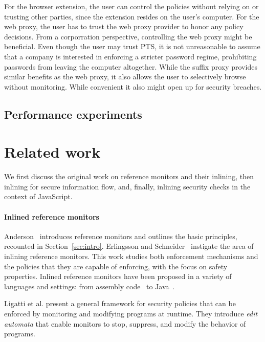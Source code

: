 \documentclass{llncs}
\begin{document}
For the browser extension, the user can control the policies without relying on
or trusting other parties, since the extension resides on the user's computer.
For the web proxy, the user has to trust the web proxy provider to honor any
policy decisions. From a corporration perspective, controlling the web proxy
might be beneficial. Even though the user may trust PTS, it is not unreasonable
to assume that a company is interested in enforcing a stricter password regime,
prohibiting passwords from leaving the computer altogether. 
While the suffix proxy provides similar benefits as the web proxy, it also allows 
the user to selectively browse without monitoring. While convenient it also
might open up for security breaches.


\subsection{Performance experiments}

\section{Related work}
\label{sec:related}
We first discuss the original work on reference monitors and their
inlining, then
inlining for secure information flow, 
and, finally,
inlining security checks in the context of
JavaScript.

\paragraph{Inlined reference monitors}
Anderson~\cite{Anderson:72} introduces reference monitors and
outlines the basic principles, recounted in Section~\ref{sec:intro}.
%
Erlingsson and Schneider~\cite{DBLP:conf/nspw/ErlingssonS99,Erlingsson:PhD04} instigate
the area of inlining reference monitors. 
This work studies both enforcement mechanisms and the policies
that they are capable of enforcing, with the focus on safety properties.
Inlined reference monitors
have been proposed in a variety of languages and settings: from
assembly code~\cite{DBLP:conf/nspw/ErlingssonS99} to Java~\cite{DBLP:conf/ecoop/DamJLP09,DBLP:journals/jcs/DamJLP10,DBLP:conf/ccs/DamGL12}.

Ligatti et al. \cite{Ligatti05editautomata:} present a 
general framework for security policies that can
be enforced by monitoring and modifying programs at runtime. 
They introduce \emph{edit automata} that enable
monitors to stop, suppress, and modify the behavior of programs. 
\end{document}
